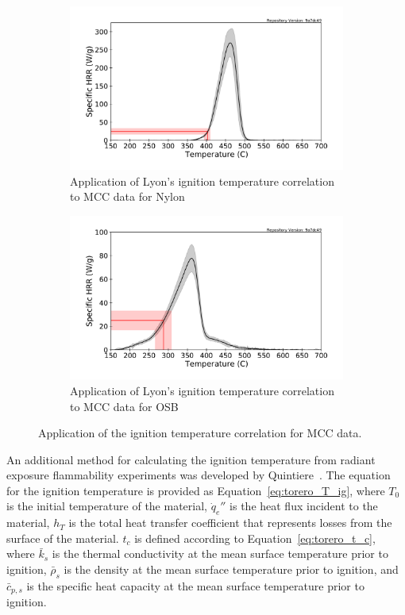 \documentclass[12pt,oneside]{book}
\begin{document}
\begin{figure}[H]
    \centering
    \begin{subfigure}[b]{0.49\textwidth}
        \centering
        \includegraphics[width=\textwidth]{Figures/Nylon_MCC_Tig.pdf}
        \caption{Application of Lyon's ignition temperature correlation to MCC data for Nylon}
    \end{subfigure}
    \hfill
    \begin{subfigure}[b]{0.49\textwidth}
        \centering
        \includegraphics[width=\textwidth]{Figures/OSB_MCC_Tig.pdf}
        \caption{Application of Lyon's ignition temperature correlation to MCC data for OSB}
    \end{subfigure}
    \caption[Application of the Ignition Temperature Correlation for MCC data] {Application of the ignition temperature correlation for MCC data.} 
    \label{fig:mcc_Tig}
\end{figure}

An additional method for calculating the ignition temperature from radiant exposure flammability experiments was developed by Quintiere~\cite{Quintiere}. The equation for the ignition temperature is provided as Equation~\ref{eq:torero_T_ig}, where $T_0$ is the initial temperature of the material, $\dot{q}_e''$ is the heat flux incident to the material, $h_T$ is the total heat transfer coefficient that represents losses from the surface of the material. $t_c$ is defined according to Equation~\ref{eq:torero_t_c}, where $\bar{k}_s$ is the thermal conductivity at the mean surface temperature prior to ignition, $\bar{\rho}_s$ is the density at the mean surface temperature prior to ignition, and $\bar{c}_{p,s}$ is the specific heat capacity at the mean surface temperature prior to ignition.
\end{document}
